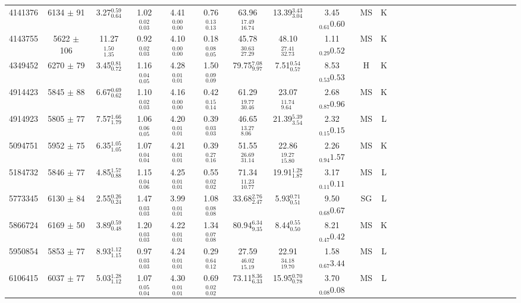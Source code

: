 \begin{table}
\begin{tabular}{cccccccccccccccccccccccccc}
4141376  & 6134 $\pm$ 91 & 3.27$_{0.64}^{0.59}$ & 1.02$_{0.03}^{0.02}$ & 4.41$_{0.00}^{0.00}$ & 0.76$_{0.13}^{0.13}$ & 63.96$_{16.74}^{17.49}$ & 13.39$_{3.04}^{3.43}$ & 3.45$_{0.61}{0.60}$ & MS & K \\
4143755  & 5622 $\pm$ 106& 11.27$_{1.35}^{1.50}$ & 0.92$_{0.03}^{0.02}$ & 4.10$_{0.00}^{0.00}$ & 0.18$_{0.05}^{0.08}$ & 45.78$_{27.29}^{30.63}$ & 48.10$_{32.73}^{27.41}$ & 1.11$_{0.29}{0.52}$ & MS & K \\
4349452  & 6270 $\pm$ 79 & 3.45$_{0.72}^{0.81}$ & 1.16$_{0.05}^{0.04}$ & 4.28$_{0.01}^{0.01}$ & 1.50$_{0.09}^{0.09}$ & 79.75$_{9.97}^{7.08}$ & 7.51$_{0.57}^{0.54}$ & 8.53$_{0.53}{0.53}$ & H & K \\
4914423  & 5845 $\pm$ 88 & 6.67$_{0.62}^{0.69}$ & 1.10$_{0.03}^{0.02}$ & 4.16$_{0.00}^{0.00}$ & 0.42$_{0.14}^{0.15}$ & 61.29$_{30.46}^{19.77}$ & 23.07$_{9.64}^{11.74}$ & 2.68$_{0.87}{0.96}$ & MS & K \\
4914923  & 5805 $\pm$ 77 & 7.57$_{1.79}^{1.66}$ & 1.06$_{0.05}^{0.06}$ & 4.20$_{0.01}^{0.01}$ & 0.39$_{0.03}^{0.03}$ & 46.65$_{8.06}^{13.27}$ & 21.39$_{3.54}^{5.39}$ & 2.32$_{0.15}{0.15}$ & MS & L \\
5094751  & 5952 $\pm$ 75 & 6.35$_{1.05}^{1.05}$ & 1.07$_{0.04}^{0.04}$ & 4.21$_{0.01}^{0.01}$ & 0.39$_{0.16}^{0.27}$ & 51.55$_{31.14}^{26.69}$ & 22.86$_{15.80}^{19.27}$ & 2.26$_{0.94}{1.57}$ & MS & K \\
5184732  & 5846 $\pm$ 77 & 4.85$_{0.88}^{1.57}$ & 1.15$_{0.06}^{0.04}$ & 4.25$_{0.01}^{0.01}$ & 0.55$_{0.02}^{0.02}$ & 71.34$_{10.77}^{11.23}$ & 19.91$_{1.87}^{1.28}$ & 3.17$_{0.11}{0.11}$ & MS & L \\
5773345  & 6130 $\pm$ 84 & 2.55$_{0.24}^{0.26}$ & 1.47$_{0.03}^{0.03}$ & 3.99$_{0.01}^{0.01}$ & 1.08$_{0.08}^{0.08}$ & 33.68$_{2.47}^{2.76}$ & 5.93$_{0.51}^{0.71}$ & 9.50$_{0.68}{0.67}$ & SG & L \\
5866724  & 6169 $\pm$ 50 & 3.89$_{0.48}^{0.59}$ & 1.20$_{0.03}^{0.03}$ & 4.22$_{0.01}^{0.01}$ & 1.34$_{0.08}^{0.07}$ & 80.94$_{9.35}^{6.34}$ & 8.44$_{0.50}^{0.55}$ & 8.21$_{0.47}{0.42}$ & MS & K \\
5950854  & 5853 $\pm$ 77 & 8.93$_{1.15}^{1.12}$ & 0.97$_{0.03}^{0.03}$ & 4.24$_{0.01}^{0.01}$ & 0.29$_{0.12}^{0.64}$ & 27.59$_{15.19}^{46.02}$ & 22.91$_{19.70}^{34.18}$ & 1.58$_{0.67}{3.44}$ & MS & L \\
6106415  & 6037 $\pm$ 77 & 5.03$_{1.12}^{1.28}$ & 1.07$_{0.04}^{0.05}$ & 4.30$_{0.01}^{0.01}$ & 0.69$_{0.02}^{0.02}$ & 73.11$_{6.33}^{8.36}$ & 15.95$_{0.78}^{0.70}$ & 3.70$_{0.08}{0.08}$ & MS & L \\

\end{tabular}
\end{table}
